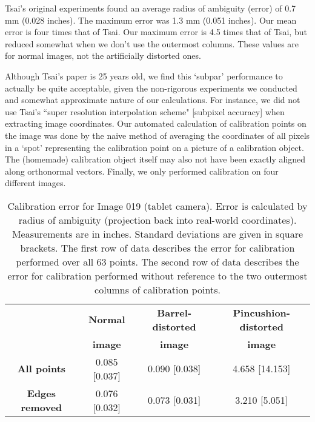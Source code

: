 Tsai's original experiments found an average radius of ambiguity (error) of 0.7 mm (0.028 inches). The maximum error was 1.3 mm (0.051 inches). Our mean error is four times that of Tsai. \cite{TSAI} Our maximum error is 4.5 times that of Tsai, but reduced somewhat when we don't use the outermost columns. These values are for normal images, not the artificially distorted ones.

Although Tsai's paper is 25 years old, we find this `subpar' performance to actually be quite acceptable, given the non-rigorous experiments we conducted and somewhat approximate nature of our calculations. For instance, we did not use Tsai's ``super resolution interpolation scheme" [subpixel accuracy] when extracting image coordinates. Our automated calculation of calibration points on the image was done by the naive method of averaging the coordinates of all pixels in a `spot' representing the calibration point on a picture of a calibration object. The (homemade) calibration object itself may also not have been exactly aligned along orthonormal vectors. Finally, we only performed calibration on four different images.\\[2cm]

\begin{table}[hbp]
  \centering
  \begin{tabular}{c c c c}
    \toprule
    \textbf{ } & \textbf{Normal} & \textbf{Barrel-distorted} & \textbf{Pincushion-distorted}\\
    \textbf{ } & \textbf{image} & \textbf{image} & \textbf{image}\\
    \midrule
    \textbf{All points} & 0.085 [0.037] & 0.090 [0.038] & 4.658 [14.153] \\
    \textbf{Edges removed} & 0.076 [0.032] & 0.073 [0.031] & 3.210 [5.051] \\
    \bottomrule
  \end{tabular}
  \caption[Calibration error for Image 019 (tablet camera)]{Calibration error for Image 019 (tablet camera). Error is calculated by radius of ambiguity (projection back into real-world coordinates). Measurements are in inches. Standard deviations are given in square brackets. The first row of data describes the error for calibration performed over all 63 points. The second row of data describes the error for calibration performed without reference to the two outermost columns of calibration points.}
  \label{tbl:stats090}
\end{table}

